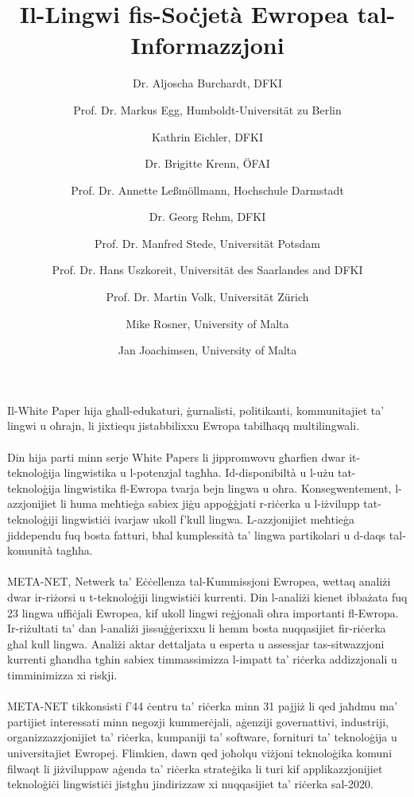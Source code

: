 \documentclass[11pt]{article}
\begin{document}
  \title{Il-Lingwi fis-Soċjetà Ewropea tal-Informazzjoni}
  
  \author{
    Dr. Aljoscha Burchardt, DFKI \and
    Prof. Dr. Markus Egg, Humboldt-Universität zu Berlin \and
    Kathrin Eichler, DFKI \and
    Dr. Brigitte Krenn, ÖFAI \and
    Prof. Dr. Annette Leßmöllmann, Hochschule Darmstadt \and
    Dr. Georg Rehm, DFKI \and
    Prof. Dr. Manfred Stede, Universität Potsdam \and
    Prof. Dr. Hans Uszkoreit, Universität des Saarlandes and DFKI \and
    Prof. Dr. Martin Volk, Universität Zürich \and
    Mike Rosner, University of Malta \and
    Jan Joachimsen, University of Malta
  }
  
  \maketitle
  
  \tableofcontents
  \clearpage
  
  Il-White Paper hija għall-edukaturi, ġurnalisti, politikanti, kommunitajiet ta’ lingwi u oħrajn, li jixtiequ jistabbilixxu Ewropa tabilħaqq multilingwali. \\\\
  Din hija parti minn serje White Papers li jippromwovu għarfien dwar it-teknoloġija lingwistika u l-potenzjal tagħha. Id-disponibiltà u l-użu tat-teknoloġija lingwistika fl-Ewropa tvarja bejn lingwa u oħra. Konsegwentement, l-azzjonijiet li huma meħtieġa sabiex jiġu appoġġjati r-riċerka u l-iżvilupp tat-teknoloġiji lingwistiċi ivarjaw ukoll f’kull lingwa.  L-azzjonijiet meħtieġa jiddependu fuq bosta fatturi, bħal kumplessità ta’ lingwa partikolari u d-daqs tal-komunità tagħha.\\\\
  META-NET, Netwerk ta’ Eċċellenza tal-Kummissjoni Ewropea, wettaq analiżi dwar ir-riżorsi u t-teknoloġiji lingwistiċi kurrenti. Din l-analiżi kienet ibbażata fuq 23 lingwa uffiċjali Ewropea, kif ukoll lingwi reġjonali oħra importanti fl-Ewropa. Ir-riżultati ta’ dan l-analiżi jissuġġerixxu li hemm bosta nuqqasijiet fir-riċerka għal kull lingwa. Analiżi aktar dettaljata u esperta u assessjar tas-sitwazzjoni kurrenti għandha tgħin sabiex timmassimizza l-impatt ta’ riċerka addizzjonali u timminimizza xi riskji.\\\\
  META-NET tikkonsisti f’44 ċentru ta’ riċerka minn 31 pajjiż li qed jaħdmu ma’ partijiet interessati minn negozji kummerċjali, aġenziji governattivi, industriji, organizzazzjonijiet ta’ riċerka, kumpaniji ta’ software, fornituri ta’ teknoloġija u universitajiet Ewropej. Flimkien, dawn qed joħolqu viżjoni teknoloġika komuni filwaqt li jiżviluppaw aġenda ta’ riċerka strateġika li turi kif applikazzjonijiet teknoloġiċi lingwistiċi jistgħu jindirizzaw xi nuqqasijiet ta’ riċerka sal-2020. 
  
\end{document}
